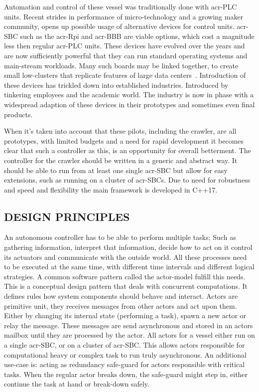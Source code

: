 Automation and control of these vessel was traditionally done with \gls{acr-PLC} units.  Recent strides in
performance of micro-technology and a growing maker community, opens up possible usage of alternative devices for
control units. \gls{acr-SBC} such as the \gls{acr-Rpi} and \gls{acr-BBB} are viable options, which
cost a magnitude less then regular \gls{acr-PLC} units. These devices have evolved over the years and are now
sufficiently powerful that they can run standard operating systems and main-stream workloads. Many such boards may be
linked together, to create small low-clusters that replicate features of large data
centers~\cite{johnston_commodity_2018}.  Introduction of these devices has trickled down into established industries.
Introduced by tinkering employees and the academic world. The industry is now in phase with a widespread adaption of
these devices in their prototypes and sometimes even final products.

When it's  taken into account that these pilots, including the crawler, are all prototypes, with limited budgets and a
need for rapid development it becomes clear that such a controller as this, is an opportunity for overall betterment.
The controller for the crawler should be written in a generic and abstract way. It should be able to run from at least
one single \gls{acr-SBC} but allow for easy extensions, such as running on a cluster of \gls{acr-SBC}s. Due to need for
robustness and speed and flexibility the main framework is developed in C++17.

\subsection{DESIGN PRINCIPLES}

An autonomous controller has to be able to perform multiple tasks; Such as gathering information, interpret that
information, decide how to act on it control its actuators and communicate with the outside world. All these processes
need to be executed at the same time, with different time intervals and different logical strategies. A common software
pattern called the actor-model fulfill this needs. This is a conceptual design pattern that deals with concurrent
computations. It defines rules how system components should behave and interact. Actors are primitive unit, they
receives messages from other actors and act upon them. Either by changing its internal state (performing a task), spawn
a new actor or relay the message. These messages are send asynchronous and stored in an actors mailbox until they are
processed by the actor. All actors for a vessel either run on a single \gls{acr-SBC}, or on a cluster of \gls{acr-SBC}.
This allows actors responsible for computational heavy or complex task to run truly asynchronous. An additional use-case
is: acting as redundancy safe-guard for actors responsible with critical tasks. When the regular actor breaks down, the
safe-guard might step in, either continue the task at hand or break-down safely.

